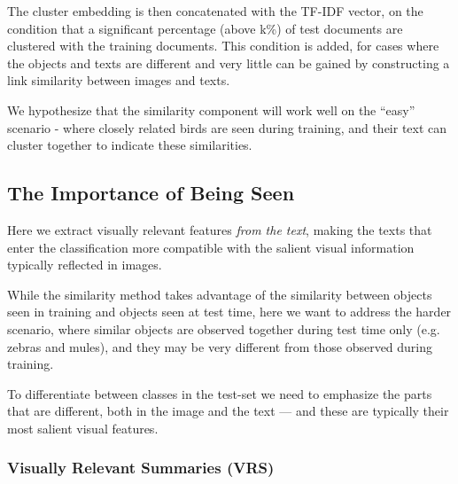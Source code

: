 \documentclass[11pt,a4paper]{article}
\newcommand\gal[1]{\textcolor{bright}{\textbf{GAL:} #1 }}
\begin{document}

The cluster embedding is then concatenated with the TF-IDF vector, on the condition that a significant percentage (above k\%) of test documents are clustered with the training documents. This condition is added, for cases where the objects and texts are different and very little can be gained by constructing a link similarity between images and texts.
\par
We hypothesize that the similarity component will work well on the \enquote{easy} scenario - where closely related birds are seen during training, and their text can cluster together to indicate these similarities.

\subsection{The Importance of Being Seen}

Here we extract visually relevant features \textit{from the text}, making the texts that enter the classification more compatible with the salient visual information typically reflected in images. 

While the similarity method takes advantage of the similarity between objects seen in training and objects seen at test time, here we want to address the harder scenario, where similar objects are observed together during test time only (e.g. zebras and mules), and they may be very different from those observed during training. 

To differentiate between classes in the test-set we need to emphasize the parts that are different, both in the image and the text --- and these are typically their most salient visual features. %

\subsubsection{Visually Relevant Summaries (VRS)}
\label{section:vrs_component}
\end{document}

